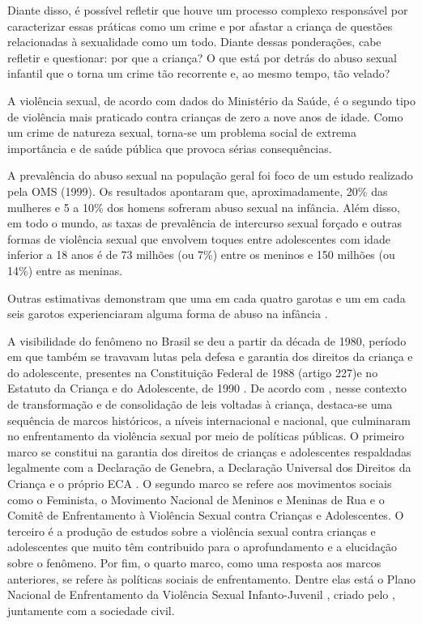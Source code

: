 Diante disso, é possível refletir que houve um processo complexo responsável por caracterizar essas práticas como um crime e por afastar a criança de questões relacionadas à sexualidade como um todo. Diante dessas ponderações, cabe refletir e questionar: por que a criança? O que está por detrás do abuso sexual infantil que o torna um crime tão recorrente e, ao mesmo tempo, tão velado?

A violência sexual, de acordo com dados do Ministério da Saúde, é o segundo tipo de violência mais praticado contra crianças de zero a nove anos de idade. Como um crime de natureza sexual, torna-se um problema social de extrema importância e de saúde pública que provoca sérias consequências.

\begin{citacao}
	A prevalência do abuso sexual na população geral foi foco de um estudo realizado pela OMS (1999). Os resultados apontaram que, aproximadamente, 20\% das mulheres e 5 a 10\% dos homens sofreram abuso sexual na infância. Além disso, em todo o mundo, as taxas de prevalência de intercurso sexual forçado e outras formas de violência sexual que envolvem toques entre adolescentes com idade inferior a 18 anos é de 73 milhões (ou 7\%) entre os meninos e 150 milhões (ou 14\%) entre as meninas. \cite[p. 69]{HABIGZANG2012}
\end{citacao}

Outras estimativas demonstram que uma em cada quatro garotas e um em cada seis garotos experienciaram alguma forma de abuso na infância .

A visibilidade do fenômeno no Brasil se deu a partir da década de 1980, período em que também se travavam lutas pela defesa e garantia dos direitos da criança e do adolescente, presentes na Constituição Federal de 1988 (artigo 227)\footnotemark e no Estatuto da Criança e do Adolescente, de 1990 . De acordo com , nesse contexto de transformação e de consolidação de leis voltadas à criança, destaca-se uma sequência de marcos históricos, a níveis internacional e nacional, que culminaram no enfrentamento da violência sexual por meio de políticas públicas. O primeiro marco se constitui na garantia dos direitos de crianças e adolescentes respaldadas legalmente com a  Declaração de Genebra, a Declaração Universal dos Direitos da Criança \citeyear{ONU1959} e o próprio ECA \cite{BRASIL1990}. O segundo marco se refere aos movimentos sociais como o Feminista, o Movimento Nacional de Meninos e Meninas de Rua e o Comitê de Enfrentamento à Violência Sexual contra Crianças e Adolescentes. O terceiro é a produção de estudos sobre a violência sexual contra crianças e adolescentes que muito têm contribuido para o aprofundamento e a elucidação sobre o fenômeno. Por fim, o quarto marco, como uma resposta aos marcos anteriores, se refere às políticas sociais de enfrentamento. Dentre elas está o Plano Nacional de Enfrentamento da Violência Sexual Infanto-Juvenil \citeyear{MJ2001}, criado pelo \citeauthor{MJ2001}, juntamente com a sociedade civil. 

